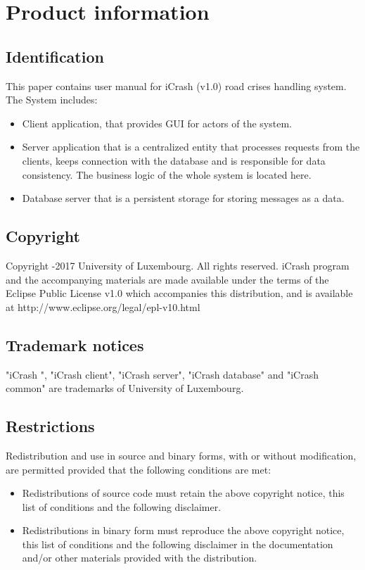 \chapter{Product information}
\vspace{-6em}


\section{Identification}
This paper contains user manual for iCrash (v1.0) road crises handling system. The System includes:
\begin{itemize}
\item Client application, that provides GUI for actors of the system.
\item Server application that is a centralized entity that processes requests from the clients, keeps connection with the database and is responsible
for data consistency. The business logic of the whole system is located here.
\item Database server that is a persistent storage for storing messages as a
data.
\end{itemize}
\section{Copyright}
Copyright -2017 University of Luxembourg. 
\newline
All rights reserved. iCrash program and the accompanying materials are made available under the terms of the Eclipse Public License v1.0 which accompanies this distribution, and is available at http://www.eclipse.org/legal/epl-v10.html 
\section{Trademark notices}
"iCrash ", "iCrash client", "iCrash server", "iCrash database" and "iCrash
common" are trademarks of University of Luxembourg. 
\section{Restrictions}
Redistribution and use in source and binary forms, with or without modification, are permitted provided that the following conditions are met:				
\begin{itemize}					 						
\item Redistributions of source code must retain the above copyright notice,
this list of conditions and the following disclaimer.
\item Redistributions in binary form must reproduce the above copyright notice,
this list of conditions and the following disclaimer in the documentation and/or other materials provided with the distribution.
\end{itemize}

